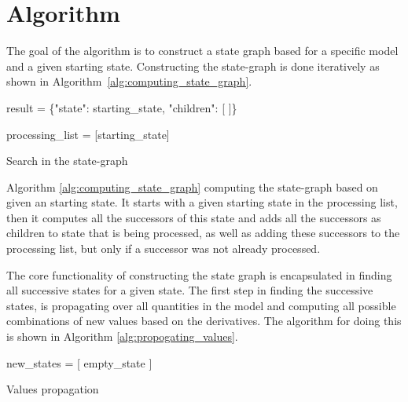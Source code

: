 \documentclass[a4paper]{article}
\begin{document}
\section{Algorithm}
The goal of the algorithm is to construct a state graph based for a specific model and a given starting state. Constructing the state-graph is done iteratively as shown in Algorithm~\ref{alg:computing_state_graph}.

\vspace{12pt}
\begin{algorithm}[H]
    result = \{"state": starting\_state, "children": [ ]\}

    processing\_list = [starting\_state]

\caption{Search in the state-graph}
\label{alg:computing_state_graph}
\end{algorithm}
\vspace{12pt}

Algorithm \ref{alg:computing_state_graph} computing the state-graph based on given an starting state. It starts with a given starting state in the processing list, then it computes all the successors of this state and adds all the successors as children to state that is being processed, as well as adding these successors to the processing list, but only if a successor was not already processed.

The core functionality of constructing the state graph is encapsulated in finding all successive states for a given state. The first step in finding the successive states, is propagating over all quantities in the model and computing all possible combinations of new values based on the derivatives. The algorithm for doing this is shown in Algorithm \ref{alg:propogating_values}.

\vspace{12pt}
\begin{algorithm}[H]
new\_states = [ empty\_state ]

\caption{Values propagation}
\label{alg:propogating_values}
\end{algorithm}
\vspace{12pt}
\end{document}
